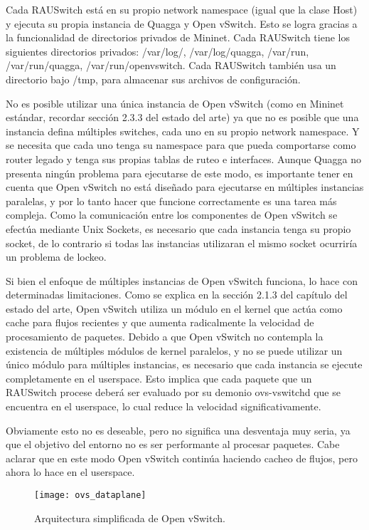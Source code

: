 Cada RAUSwitch está en su propio network namespace (igual que la clase Host) y ejecuta su propia instancia de Quagga y Open vSwitch. Esto se logra gracias a la funcionalidad de directorios privados de Mininet. Cada RAUSwitch tiene los siguientes directorios privados: /var/log/, /var/log/quagga, /var/run, /var/run/quagga, /var/run/openvswitch. Cada RAUSwitch también usa un directorio bajo /tmp, para almacenar sus archivos de configuración.

No es posible utilizar una única instancia de Open vSwitch (como en Mininet estándar, recordar sección 2.3.3 del estado del arte) ya que no es posible que una instancia defina múltiples switches, cada uno en su propio network namespace. Y se necesita que cada uno tenga su namespace para que pueda comportarse como router legado y tenga sus propias tablas de ruteo e interfaces. Aunque Quagga no presenta ningún problema para ejecutarse de este modo, es importante tener en cuenta que Open vSwitch no está diseñado para ejecutarse en múltiples instancias paralelas, y por lo tanto hacer que funcione correctamente es una tarea más compleja. Como la comunicación entre los componentes de Open vSwitch se efectúa mediante Unix Sockets, es necesario que cada instancia tenga su propio socket, de lo contrario si todas las instancias utilizaran el mismo socket ocurriría un problema de lockeo.

Si bien el enfoque de múltiples instancias de Open vSwitch funciona, lo hace con determinadas limitaciones. Como se explica en la sección 2.1.3 del capítulo del estado del arte, Open vSwitch utiliza un módulo en el kernel que actúa como cache para flujos recientes y que aumenta radicalmente la velocidad de procesamiento de paquetes. Debido a que Open vSwitch no contempla la existencia de múltiples módulos de kernel paralelos, y no se puede utilizar un único módulo para múltiples instancias, es necesario que cada instancia se ejecute completamente en el userspace. Esto implica que cada paquete que un RAUSwitch procese deberá ser evaluado por su demonio ovs-vswitchd que se encuentra en el userspace, lo cual reduce la velocidad significativamente.

Obviamente esto no es deseable, pero no significa una desventaja muy seria, ya que el objetivo del entorno no es ser performante al procesar paquetes. Cabe aclarar que en este modo Open vSwitch continúa haciendo cacheo de flujos, pero ahora lo hace en el userspace.

\begin{figure}[t]
	\caption{Arquitectura simplificada de Open vSwitch.}
	\texttt{[image: ovs\_dataplane]}
	\centering
	\label{fig:ovs_dataplane}
\end{figure}

